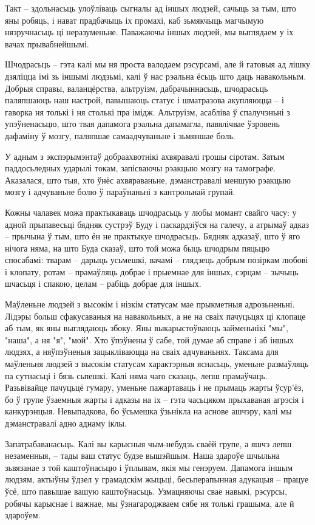 Такт – здольнасьць улоўліваць сыгналы ад іншых людзей, сачыць за тым, што яны робяць, і нават прадбачыць іх промахі, каб зьмякчыць магчымую нязручнасьць ці неразуменьне. Паважаючы іншых людзей, мы выглядаем у іх вачах прывабнейшымі.

Шчодрасьць – гэта калі мы ня проста валодаем рэсурсамі, але й гатовыя ад лішку дзяліцца імі зь іншымі людзьмі, калі ў нас рэальна ёсьць што даць навакольным. Добрыя справы, валанцёрства, альтруізм, дабрачыннасьць, шчодрасьць паляпшаюць наш настрой, павышаюць статус і шматразова акупляюцца – і гаворка ня толькі і ня столькі пра імідж. Альтруізм, асабліва ў спалучэньні з упэўненасьцю, што твая дапамога рэальна дапамагла, павялічвае ўзровень дафаміну ў мозгу, паляпшае самаадчуваньне і зьмяншае боль.

У адным з экспэрымэнтаў добраахвотнікі ахвяравалі грошы сіротам. Затым паддосьледных ударылі токам, запісваючы рэакцыю мозгу на тамографе. Аказалася, што тыя, хто ўнёс ахвяраваньне, дэманстравалі меншую рэакцыю мозгу і адчуваньне болю ў параўнаньні з кантрольнай групай.

Кожны чалавек можа практыкаваць шчодрасьць у любы момант свайго часу: у адной прыпавесьці бядняк сустрэў Буду і паскардзіўся на галечу, а атрымаў адказ – прычына ў тым, што ён не практыкуе шчодрасьць. Бядняк адказаў, што ў яго нічога няма, на што Буда сказаў, што той можа быць шчодрым пяцьцю спосабамі: тварам – дарыць усьмешкі, вачамі – глядзець добрым позіркам любові і клопату, ротам – прамаўляць добрае і прыемнае для іншых, сэрцам – зычыць шчасьця і спакою, целам – рабіць добрае для іншых.

Маўленьне людзей з высокім і нізкім статусам мае прыкметныя адрозьненьні. Лідэры больш сфакусаваныя на навакольных, а не на сваіх пачуцьцях ці клопаце аб тым, як яны выглядаюць збоку. Яны выкарыстоўваюць займеньнікі "мы", "наша", а ня "я", "мой". Хто ўпэўнены ў сабе, той думае аб справе і аб іншых людзях, а няўпэўненыя зацыкліваюцца на сваіх адчуваньнях. Таксама для маўленьня людзей з высокім статусам характэрныя яснасьць, уменьне размаўляць па сутнасьці і бязь сьпешкі. Калі няма чаго сказаць, лепш прамаўчаць. Разьвівайце пачуцьцё гумару, уменьне пажартаваць і не прымаць жарты ўсур'ёз, бо ў групе ўзаемныя жарты і адказы на іх – гэта часьцяком прыхаваная агрэсія і канкурэнцыя. Невыпадкова, бо ўсьмешка ўзьнікла на аснове ашчэру, калі мы дэманстравалі адно аднаму іклы.

Запатрабаванасьць. Калі вы карысныя чым-небудзь сваёй групе, а яшчэ лепш незаменныя, – тады ваш статус будзе вышэйшым. Наша здароўе шчыльна зьвязанае з той каштоўнасьцю і ўплывам, якія мы генэруем. Дапамога іншым людзям, актыўны ўдзел у грамадскім жыцьці, бесьперапынная адукацыя – працуе ўсё, што павышае вашую каштоўнасьць. Узмацняючы свае навыкі, рэсурсы, робячы карыснае і важнае, мы ўзнагароджваем сябе ня толькі грашыма, але й здароўем.

